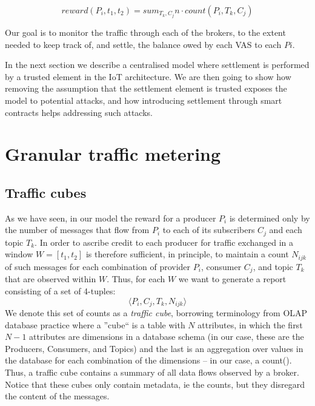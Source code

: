 \documentclass[conference]{IEEEtran}
\begin{document}
\begin{equation}
 \mathit{reward}(P_i, t_1, t_2) = sum_{T_k, C_j} n \cdot \mathit{count}(P_i, T_k, C_j)   
\label{eq:reward}
 \end{equation}
 

Our goal is to monitor the traffic through each of the brokers, to the extent needed to keep track of, and settle, the balance owed by each VAS to each $ Pi $.

In the next section we describe a centralised model where settlement is performed by a trusted element in the IoT architecture.
We are then going to show how removing the assumption that the settlement element is trusted exposes the model to potential attacks, and how introducing settlement through smart contracts helps addressing such attacks.

\section{Granular traffic metering}

\subsection{Traffic cubes}

As we have seen, in our model the reward for a producer $ P_i $ is determined only by the number of messages that flow from $ P_i $ to each of its subscribers $ C_j $ and each topic $ T_k $.
In order to ascribe credit to each producer for traffic exchanged in a window $ W = [t_1, t_2] $ is therefore sufficient, in principle, to maintain a count $ N_{ijk} $ of such messages for each combination of provider $ P_i $, consumer $ C_j $, and topic $ T_k $ that are observed within $ W $.
Thus, for each $ W $ we want to generate a report consisting of a set of 4-tuples:
\[  \langle P_i, C_j, T_k, N_{ijk} \rangle  \]
We denote this set of counts as a \textit{traffic cube}, borrowing terminology from OLAP database practice where a ''cube`` is a table with $ N $ attributes, in which the first $ N-1 $ attributes are  dimensions in a database schema (in our case, these are the Producers, Consumers, and Topics) and the last is an aggregation over values in the database for each combination of the dimensions -- in our case, a count().
Thus, a traffic cube contains a summary  of all data flows observed by a broker. Notice that these cubes only contain metadata, ie the counts, but they disregard the content of the messages.
\end{document}
